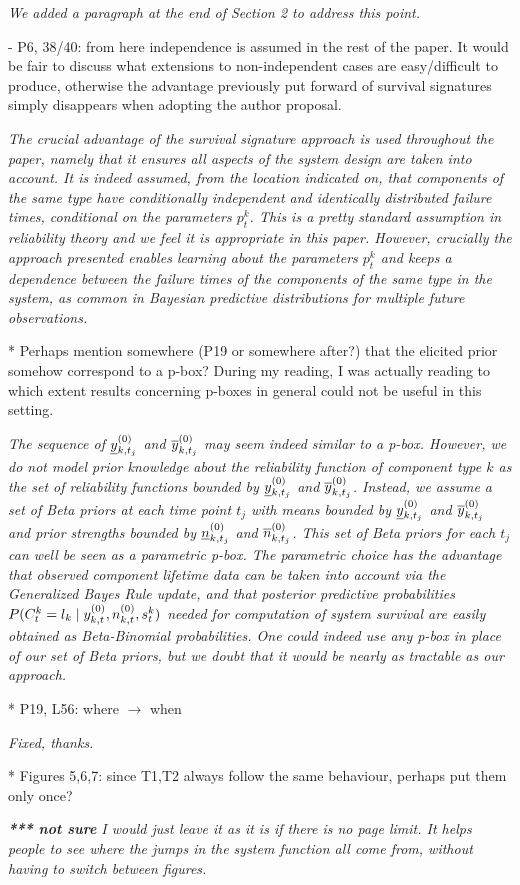 \documentclass[12pt, a4paper]{elsarticle}
\begin{document}
\medskip
\emph{We added a paragraph at the end of Section 2 to address this point.}
\medskip

- P6, 38/40: from here independence is assumed in the rest of the paper. It would be fair to discuss what extensions to non-independent cases are easy/difficult to produce, otherwise the advantage previously put forward of survival signatures simply disappears when adopting the author proposal.
 
\medskip
\emph{The crucial advantage of the survival signature approach is used throughout the paper, namely that it ensures all aspects of the system design are taken into account. It is indeed assumed, from the location indicated on, that components of the same type have conditionally independent and identically distributed failure times, conditional on the parameters $p_t^k$. This is a pretty standard assumption in reliability theory and we feel it is appropriate in this paper. However, crucially the approach presented enables learning about the parameters $p_t^k$ and keeps a dependence between the failure times of the components of the same type in the system, as common in Bayesian predictive distributions for multiple future observations.}
\medskip

* Perhaps mention somewhere (P19 or somewhere after?) that the elicited prior somehow correspond to a p-box? During my reading, I was actually reading to which extent results concerning p-boxes in general could not be useful in this setting.

\medskip
\emph{The sequence of $\underline{y}^{(0)}_{k,t_j}$ and $\overline{y}^{(0)}_{k,t_j}$ may seem indeed similar to a p-box.
However, we do not model prior knowledge about the reliability function of component type $k$
as the set of reliability functions bounded by $\underline{y}^{(0)}_{k,t_j}$ and $\overline{y}^{(0)}_{k,t_j}$.
Instead, we assume a set of Beta priors at each time point $t_j$ with means bounded by $\underline{y}^{(0)}_{k,t_j}$ and $\overline{y}^{(0)}_{k,t_j}$
and prior strengths bounded by $\underline{n}^{(0)}_{k,t_j}$ and $\overline{n}^{(0)}_{k,t_j}$.
This set of Beta priors for each $t_j$ can well be seen as a parametric p-box.
The parametric choice has the advantage that observed component lifetime data can be taken into account via the Generalized Bayes Rule update,
and that posterior predictive probabilities $P(C^k_t = l_k \mid y^{(0)}_{k,t}, n^{(0)}_{k,t}, s^k_t)$ needed for computation of system survival
are easily obtained as Beta-Binomial probabilities.
One could indeed use any p-box in place of our set of Beta priors,
but we doubt that it would be nearly as tractable as our approach.
}
\medskip

* P19, L56: where $\to$ when

\medskip
\emph{Fixed, thanks.}
\medskip

* Figures 5,6,7: since T1,T2 always follow the same behaviour, perhaps put them only once?

\medskip
\emph{\textbf{*** not sure} I would just leave it as it is if there is no page limit.
It helps people to see where the jumps in the system function all come from, without having to switch between figures.}
\medskip
\end{document}
